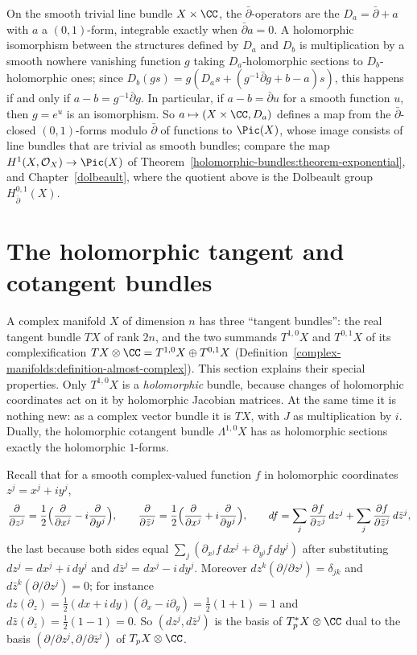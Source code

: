 \begin{example}\label{holomorphic-bundles:example-dbar-trivial-bundle}
On the smooth trivial line bundle $X \times \CC$, the $\bar\partial$-operators are the $D_a = \bar\partial + a$ with $a$ a $(0,1)$-form, integrable exactly when $\bar\partial a = 0$. A holomorphic isomorphism between the
structures defined by $D_a$ and $D_b$ is multiplication by a smooth nowhere vanishing function $g$ taking $D_a$-holomorphic sections to $D_b$-holomorphic ones; since
$D_b(gs) = g(D_as + (g^{-1}\bar\partial g + b - a)s)$, this happens if and only if $a - b = g^{-1}\bar\partial g$. In particular, if $a - b = \bar\partial u$ for a smooth function $u$, then $g = e^u$ is an
isomorphism. So $a \mapsto (X \times \CC, D_a)$ defines a map from the $\bar\partial$-closed $(0,1)$-forms modulo $\bar\partial$ of functions to $\Pic(X)$, whose image consists of line bundles that are trivial as smooth
bundles; compare the map $H^1(X, \mathcal{O}_X) \to \Pic(X)$ of Theorem~\ref{holomorphic-bundles:theorem-exponential}, and Chapter~\ref{dolbeault}, where the quotient above is the Dolbeault group
$H^{0,1}_{\bar\partial}(X)$.
\end{example}

\section{The holomorphic tangent and cotangent bundles}\label{holomorphic-bundles:section-tangent}

A complex manifold $X$ of dimension $n$ has three ``tangent bundles'': the real tangent bundle $TX$ of rank $2n$, and the two summands $T^{1,0}X$ and $T^{0,1}X$ of its complexification
$TX \otimes \CC = T^{1,0}X \oplus T^{0,1}X$ (Definition~\ref{complex-manifolds:definition-almost-complex}). This section explains their special properties. Only $T^{1,0}X$ is a \emph{holomorphic} bundle, because changes of holomorphic
coordinates act on it by holomorphic Jacobian matrices. At the same time it is nothing new: as a complex vector bundle it is $TX$, with $J$ as multiplication by $i$. Dually, the holomorphic cotangent bundle
$\Lambda^{1,0}X$ has as holomorphic sections exactly the holomorphic $1$-forms.

Recall that for a smooth complex-valued function $f$ in holomorphic coordinates $z^j = x^j + iy^j$,
\[
\frac{\partial}{\partial z^j} = \frac12\Bigl(\frac{\partial}{\partial x^j} - i\frac{\partial}{\partial y^j}\Bigr), \qquad \frac{\partial}{\partial\bar z^j} = \frac12\Bigl(\frac{\partial}{\partial x^j} + i\frac{\partial}{\partial y^j}\Bigr), \qquad
df = \sum_j\frac{\partial f}{\partial z^j}\,dz^j + \sum_j\frac{\partial f}{\partial\bar z^j}\,d\bar z^j,
\]
the last because both sides equal $\sum_j(\partial_{x^j}f\,dx^j + \partial_{y^j}f\,dy^j)$ after substituting $dz^j = dx^j + i\,dy^j$ and $d\bar z^j = dx^j - i\,dy^j$. Moreover $dz^k(\partial/\partial z^j) = \delta_{jk}$ and
$d\bar z^k(\partial/\partial z^j) = 0$; for instance $dz(\partial_z) = \frac12(dx + i\,dy)(\partial_x - i\partial_y) = \frac12(1 + 1) = 1$ and $d\bar z(\partial_z) = \frac12(1 - 1) = 0$. So $(dz^j, d\bar z^j)$ is the
basis of $T^*_pX \otimes \CC$ dual to the basis $(\partial/\partial z^j, \partial/\partial\bar z^j)$ of $T_pX \otimes \CC$.


